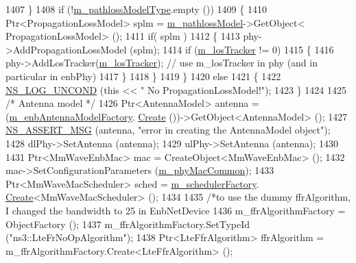 \begin{DoxyCode}
1407         \}
1408         \textcolor{keywordflow}{if} (!\hyperlink{classns3_1_1MmWaveHelper_a7f17e9bc4797b51d9a31d16c7e667960}{m\_pathlossModelType}.empty ())
1409         \{
1410                 Ptr<PropagationLossModel> splm = \hyperlink{classns3_1_1MmWaveHelper_a4de60027f5a256fe51033e6d6803e9b0}{m\_pathlossModel}->GetObject<
      PropagationLossModel> ();
1411                 \textcolor{keywordflow}{if}( splm )
1412                 \{
1413                         phy->AddPropagationLossModel (splm);
1414                         \textcolor{keywordflow}{if} (\hyperlink{classns3_1_1MmWaveHelper_af8d5d3767371b17c144a0bea7e92af44}{m\_losTracker} != 0)
1415                         \{
1416                                 phy->AddLosTracker(\hyperlink{classns3_1_1MmWaveHelper_af8d5d3767371b17c144a0bea7e92af44}{m\_losTracker}); \textcolor{comment}{// use m\_losTracker in phy
       (and in particular in enbPhy)}
1417                         \}
1418                 \}
1419         \}
1420         \textcolor{keywordflow}{else}
1421         \{
1422                 \hyperlink{log-macros-disabled_8h_a0b36e5e182b37194f85ef1c5e979fb2e}{NS\_LOG\_UNCOND} (\textcolor{keyword}{this} << \textcolor{stringliteral}{" No PropagationLossModel!"});
1423         \}
1424 
1425         \textcolor{comment}{/* Antenna model */}
1426         Ptr<AntennaModel> antenna = (\hyperlink{classns3_1_1MmWaveHelper_a840991b3233061820c1a85a403510388}{m\_enbAntennaModelFactory}.
      \hyperlink{classns3_1_1ObjectFactory_a18152e93f0a6fe184ed7300cb31e9896}{Create} ())->GetObject<AntennaModel> ();
1427         \hyperlink{assert_8h_aff5ece9066c74e681e74999856f08539}{NS\_ASSERT\_MSG} (antenna, \textcolor{stringliteral}{"error in creating the AntennaModel object"});
1428         dlPhy->SetAntenna (antenna);
1429         ulPhy->SetAntenna (antenna);
1430 
1431         Ptr<MmWaveEnbMac> mac = CreateObject<MmWaveEnbMac> ();
1432         mac->SetConfigurationParameters (\hyperlink{classns3_1_1MmWaveHelper_a6aaa35de743b9a88998de0128b1046b4}{m\_phyMacCommon});
1433         Ptr<MmWaveMacScheduler> sched = \hyperlink{classns3_1_1MmWaveHelper_ab42906da163580835d24bfd206242167}{m\_schedulerFactory}.
      \hyperlink{classns3_1_1ObjectFactory_a18152e93f0a6fe184ed7300cb31e9896}{Create}<MmWaveMacScheduler> ();
1434 
1435         \textcolor{comment}{/*to use the dummy ffrAlgorithm, I changed the bandwidth to 25 in EnbNetDevice}
1436 \textcolor{comment}{        m\_ffrAlgorithmFactory = ObjectFactory ();}
1437 \textcolor{comment}{        m\_ffrAlgorithmFactory.SetTypeId ("ns3::LteFrNoOpAlgorithm");}
1438 \textcolor{comment}{        Ptr<LteFfrAlgorithm> ffrAlgorithm = m\_ffrAlgorithmFactory.Create<LteFfrAlgorithm> ();}

\end{DoxyCode}

